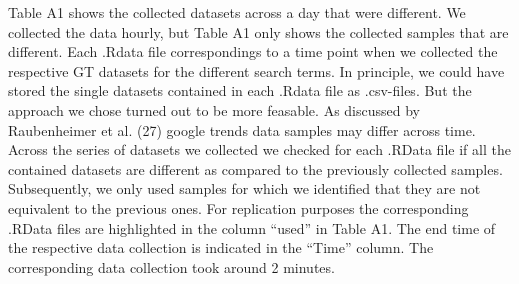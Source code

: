 \documentclass[
  letterpaper,
  DIV=11,
  numbers=noendperiod]{scrartcl}
\begin{document}
Table A1 shows the collected datasets across a day that were different.
We collected the data hourly, but Table A1 only shows the collected
samples that are different. Each .Rdata file correspondings to a time
point when we collected the respective GT datasets for the different
search terms. In principle, we could have stored the single datasets
contained in each .Rdata file as .csv-files. But the approach we chose
turned out to be more feasable. As discussed by Raubenheimer et al. (27)
google trends data samples may differ across time. Across the series of
datasets we collected we checked for each .RData file if all the
contained datasets are different as compared to the previously collected
samples. Subsequently, we only used samples for which we identified that
they are not equivalent to the previous ones. For replication purposes
the corresponding .RData files are highlighted in the column ``used'' in
Table A1. The end time of the respective data collection is indicated in
the ``Time'' column. The corresponding data collection took around 2
minutes.
\end{document}
